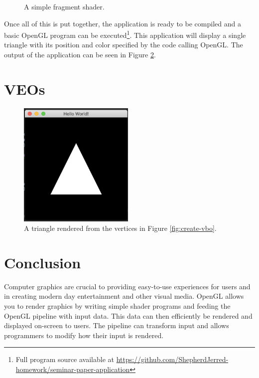 \documentclass{article}
\begin{document}
\begin{figure}[h]
	
	\caption{A simple fragment shader.}
	\label{fig:fragment-shader}
\end{figure}

Once all of this is put together, the application is ready to be compiled and a basic OpenGL program can be executed\footnote{Full program source available at \url{https://github.com/ShepherdJerred-homework/seminar-paper-application}}. This application will display a single triangle with its position and color specified by the code calling OpenGL. The output of the application can be seen in Figure \ref{fig:final-product}.

\section{VEOs}

\begin{figure}[h]
    \centering
    \includegraphics[height=6cm]{triangle}
	\caption{A triangle rendered from the vertices in Figure \ref{fig:create-vbo}.}
	\label{fig:final-product}
\end{figure}

\section{Conclusion}
Computer graphics are crucial to providing easy-to-use experiences for users and in creating modern day entertainment and other visual media. OpenGL allows you to render graphics by writing simple shader programs and feeding the OpenGL pipeline with input data. This data can then efficiently be rendered and displayed on-screen to users. The pipeline can transform input and allows programmers to modify how their input is rendered.

\clearpage

{}

\end{document}
